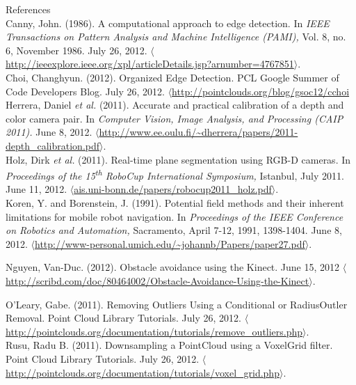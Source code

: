 \documentclass[12pt]{report}
\renewcommand{\large}{\fontsize{14pt}{14pt}\selectfont}
\begin{document}
\clearpage
{}
{}
{\large References} \\
\linebreak
{}
\label{bib:canny}
Canny, John. (1986). A computational approach to edge detection. In \textit{IEEE Transactions on Pattern Analysis and Machine Intelligence (PAMI),} Vol. 8, no. 6, November 1986. July 26, 2012. $\langle$\url{http://ieeexplore.ieee.org/xpl/articleDetails.jsp?arnumber=4767851}$\rangle$. \\
\label{bib:choi}
Choi, Changhyun. (2012). Organized Edge Detection. PCL Google Summer of Code Developers Blog. July 26, 2012. $\langle$\url{http://pointclouds.org/blog/gsoc12/cchoi} \\
\label{bib:herrera}
Herrera, Daniel \textit{et al.} (2011). Accurate and practical calibration of a depth and color camera pair. In \textit{Computer Vision, Image Analysis, and Processing (CAIP 2011).} June 8, 2012. $\langle$\url{http://www.ee.oulu.fi/~dherrera/papers/2011-depth_calibration.pdf}$\rangle$. \\
\label{bib:holz}
Holz, Dirk \textit{et al.} (2011). Real-time plane segmentation using RGB-D cameras. In \textit{Proceedings of the 15\textsuperscript{th} RoboCup International Symposium,} Istanbul, July 2011. June 11, 2012. $\langle$\url{ais.uni-bonn.de/papers/robocup2011_holz.pdf}$\rangle$. \\
\label{bib:koren}
Koren, Y. and Borenstein, J. (1991). Potential field methods and their inherent limitations for mobile robot navigation. In \textit{Proceedings of the IEEE Conference on Robotics and Automation,} Sacramento, April 7-12, 1991, 1398-1404. June 8, 2012. $\langle$\url{http://www-personal.umich.edu/~johannb/Papers/paper27.pdf}$\rangle$.
\begin{sloppypar}
\label{bib:nguyen}
Nguyen, Van-Duc. (2012). Obstacle avoidance using the Kinect. June 15, 2012 $\langle$\url{http://scribd.com/doc/80464002/Obstacle-Avoidance-Using-the-Kinect}$\rangle$.
\end{sloppypar}
\label{bib:oleary}
O'Leary, Gabe. (2011). Removing Outliers Using a Conditional or RadiusOutler Removal. Point Cloud Library Tutorials. July 26, 2012. $\langle$\url{http://pointclouds.org/documentation/tutorials/remove_outliers.php}$\rangle$. \\
\label{bib:rusu}
Rusu, Radu B. (2011). Downsampling a PointCloud using a VoxelGrid filter. Point Cloud Library Tutorials. July 26, 2012. $\langle$\url{http://pointclouds.org/documentation/tutorials/voxel_grid.php}$\rangle$. \\
\end{document}
